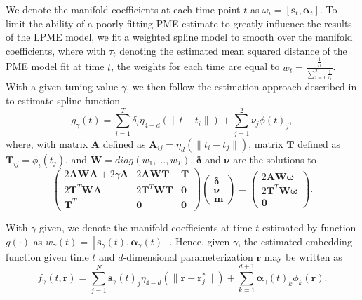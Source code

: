 \documentclass[11pt,reqno]{article}
\theoremstyle{definition}
\begin{document}
We denote the manifold coefficients at each time point $t$ as $\omega_i = [\mathbf{s}_t, \mathbf{\alpha}_t]$. To limit the ability of a poorly-fitting PME estimate to greatly influence the results of the LPME model, we fit a weighted spline model to smooth over the manifold coefficients, where with $\tau_t$ denoting the estimated mean squared distance of the PME model fit at time $t$, the weights for each time are equal to $w_t = \frac{\frac{1}{\tau_t}}{\sum_{i=1}^{T}\frac{1}{\tau_i}}$. With a given tuning value $\gamma$, we then follow the estimation approach described in \cite{mengPrincipalManifoldEstimation2021} to estimate spline function
\[%
  g_{\gamma}(t) = \sum_{i=1}^{T}\delta_i \eta_{4-d}\left(\|t - t_i\|\right) + \sum_{j=1}^{2}\nu_j\phi(t)_j
,\]%
where, with matrix $\mathbf{A}$ defined as $\mathbf{A}_{ij} = \eta_d\left(\|t_i - t_j\|\right)$, matrix $\mathbf{T}$ defined as $\mathbf{T}_{ij} = \phi_i(t_j)$, and $\mathbf{W} = diag(w_1, \dots, w_T)$,  $\mathbf{\delta}$ and $\mathbf{\nu}$ are the solutions to 
\[%
  \left(
  \begin{array}{ccc}
    2\mathbf{A}\mathbf{W}\mathbf{A} + 2\gamma\mathbf{A} & 2\mathbf{A}\mathbf{W}\mathbf{T} & \mathbf{T} \\
    2\mathbf{T}^{T}\mathbf{W}\mathbf{A} & 2\mathbf{T}^{T}\mathbf{W}\mathbf{T} & \mathbf{0} \\
    \mathbf{T}^{T} & \mathbf{0} & \mathbf{0}
  \end{array}
  \right)\left(
  \begin{array}{c}
    \mathbf{\delta} \\
    \mathbf{\nu} \\
    \mathbf{m}
  \end{array}
  \right) = \left(
  \begin{array}{c}
    2\mathbf{A}\mathbf{W}\mathbf{\omega} \\
    2\mathbf{T}^{T}\mathbf{W}\mathbf{\omega} \\
    \mathbf{0}
  \end{array}
  \right)
.\]%

With $\gamma$ given, we denote the manifold coefficients at time $t$ estimated by function $g(\cdot)$ as $w_{\gamma}(t) = \left[\mathbf{s}_{\gamma}(t), \mathbf{\alpha}_{\gamma}(t)\right]$. Hence, given $\gamma$, the estimated embedding function given time $t$ and $d$-dimensional parameterization $\mathbf{r}$ may be written as
\[%
  f_{\gamma}(t, \mathbf{r}) = \sum_{j=1}^{N}\mathbf{s}_{\gamma}(t)_j \eta_{4-d}\left(\|\mathbf{r} - \mathbf{r}_j^*\|\right) + \sum_{k=1}^{d+1}\mathbf{\alpha}_{\gamma}(t)_k \phi_k(\mathbf{r})
.\]%
\end{document}
